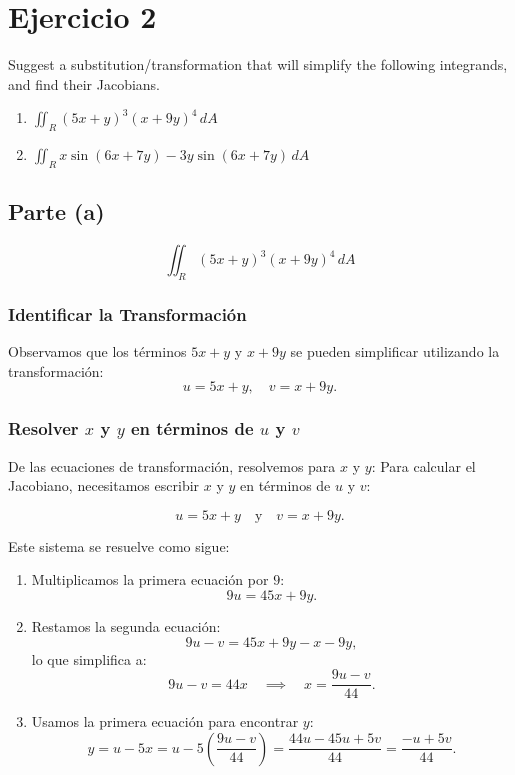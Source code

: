 \section{Ejercicio 2}
    Suggest a substitution/transformation that will simplify the following integrands, and find their Jacobians.
    \begin{enumerate}
        \item $\iint_R (5x + y)^3 (x + 9y)^4 \, dA$
        \item $\iint_R x \sin(6x + 7y) - 3y \sin(6x + 7y) \, dA$
    \end{enumerate}

    \subsection*{Parte (a)}
\[
\iint_R (5x + y)^3 (x + 9y)^4 \, dA
\]

\subsubsection*{Identificar la Transformación}
Observamos que los términos \(5x + y\) y \(x + 9y\) se pueden simplificar utilizando la transformación:
\[
u = 5x + y, \quad v = x + 9y.
\]

\subsubsection*{Resolver \(x\) y \(y\) en términos de \(u\) y \(v\)}
De las ecuaciones de transformación, resolvemos para \(x\) y \(y\):
Para calcular el Jacobiano, necesitamos escribir \(x\) y \(y\) en términos de \(u\) y \(v\):

\[
u = 5x + y \quad \text{y} \quad v = x + 9y.
\]

Este sistema se resuelve como sigue:

\begin{enumerate}[label=\arabic*.]
    \item Multiplicamos la primera ecuación por \(9\):
    \[
    9u = 45x + 9y.
    \]

    \item Restamos la segunda ecuación:
    \[
    9u - v = 45x + 9y - x - 9y,
    \]
    lo que simplifica a:
    \[
    9u - v = 44x \quad \implies \quad x = \frac{9u - v}{44}.
    \]

    \item Usamos la primera ecuación para encontrar \(y\):
    \[
    y = u - 5x = u - 5 \left( \frac{9u - v}{44} \right) = \frac{44u - 45u + 5v}{44} = \frac{-u + 5v}{44}.
    \]

\end{enumerate}

